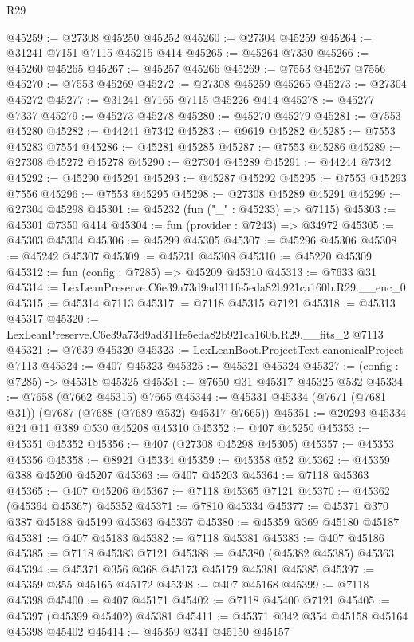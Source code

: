 \begin{lexlean}{R29}
\begin{coremodule}
@45259 := @27308 @45250 @45252
@45260 := @27304 @45259
@45264 := @31241 @7151 @7115 @45215 @414
@45265 := @45264 @7330
@45266 := @45260 @45265
@45267 := @45257 @45266
@45269 := @7553 @45267 @7556
@45270 := @7553 @45269
@45272 := @27308 @45259 @45265
@45273 := @27304 @45272
@45277 := @31241 @7165 @7115 @45226 @414
@45278 := @45277 @7337
@45279 := @45273 @45278
@45280 := @45270 @45279
@45281 := @7553 @45280
@45282 := @44241 @7342
@45283 := @9619 @45282
@45285 := @7553 @45283 @7554
@45286 := @45281 @45285
@45287 := @7553 @45286
@45289 := @27308 @45272 @45278
@45290 := @27304 @45289
@45291 := @44244 @7342
@45292 := @45290 @45291
@45293 := @45287 @45292
@45295 := @7553 @45293 @7556
@45296 := @7553 @45295
@45298 := @27308 @45289 @45291
@45299 := @27304 @45298
@45301 := @45232 (fun ("_" : @45233) => @7115)
@45303 := @45301 @7350 @414
@45304 := fun (provider : @7243) => @34972
@45305 := @45303 @45304
@45306 := @45299 @45305
@45307 := @45296 @45306
@45308 := @45242 @45307
@45309 := @45231 @45308
@45310 := @45220 @45309
@45312 := fun (config : @7285) => @45209 @45310
@45313 := @7633 @31
@45314 := LexLeanPreserve.C6e39a73d9ad311fe5eda82b921ca160b.R29.__enc_0
@45315 := @45314 @7113
@45317 := @7118 @45315 @7121
@45318 := @45313 @45317
@45320 := LexLeanPreserve.C6e39a73d9ad311fe5eda82b921ca160b.R29.__fits_2 @7113
@45321 := @7639 @45320
@45323 := LexLeanBoot.ProjectText.canonicalProject @7113
@45324 := @407 @45323
@45325 := @45321 @45324
@45327 := (config : @7285) -> @45318 @45325
@45331 := @7650 @31 @45317 @45325 @532
@45334 := @7658 (@7662 @45315) @7665
@45344 := @45331 @45334 (@7671 (@7681 @31)) (@7687 (@7688 (@7689 @532) @45317 @7665))
@45351 := @20293 @45334 @24 @11 @389 @530 @45208 @45310
@45352 := @407 @45250
@45353 := @45351 @45352
@45356 := @407 (@27308 @45298 @45305)
@45357 := @45353 @45356
@45358 := @8921 @45334
@45359 := @45358 @52
@45362 := @45359 @388 @45200 @45207
@45363 := @407 @45203
@45364 := @7118 @45363
@45365 := @407 @45206
@45367 := @7118 @45365 @7121
@45370 := @45362 (@45364 @45367) @45352
@45371 := @7810 @45334
@45377 := @45371 @370 @387 @45188 @45199 @45363 @45367
@45380 := @45359 @369 @45180 @45187
@45381 := @407 @45183
@45382 := @7118 @45381
@45383 := @407 @45186
@45385 := @7118 @45383 @7121
@45388 := @45380 (@45382 @45385) @45363
@45394 := @45371 @356 @368 @45173 @45179 @45381 @45385
@45397 := @45359 @355 @45165 @45172
@45398 := @407 @45168
@45399 := @7118 @45398
@45400 := @407 @45171
@45402 := @7118 @45400 @7121
@45405 := @45397 (@45399 @45402) @45381
@45411 := @45371 @342 @354 @45158 @45164 @45398 @45402
@45414 := @45359 @341 @45150 @45157

\end{coremodule}
\end{lexlean}
